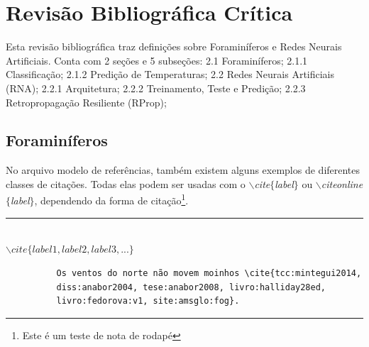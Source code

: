 \documentclass[oneside,openright,12pt]{ufsm_2015} %
\author{Marinara Rübenich Fumagalli}   %
\begin{document}
    \pretextual  %
    
    
    \geraintro  %
    
    \chapter{Revisão Bibliográfica Crítica}
    
        \par Esta revisão bibliográfica traz definições sobre Foraminíferos e Redes Neurais Artificiais. Conta com 2 seções e 5 subseções: 2.1 Foraminíferos; 2.1.1 Classificação; 2.1.2 Predição de Temperaturas; 2.2 Redes Neurais Artificiais (RNA); 2.2.1 Arquitetura; 2.2.2 Treinamento, Teste e Predição; 2.2.3 Retropropagação Resiliente (RProp); 
        
        \section{Foraminíferos}
            \par No arquivo modelo de referências, também existem alguns exemplos de diferentes classes de citações. Todas elas podem ser usadas com o \textit{$\backslash$cite$\{$label$\}$} ou \textit{$\backslash$citeonline$\{$label$\}$}, dependendo da forma de citação\footnote{Este é um teste de nota de rodapé}.
          
          \begin{center}\rule{0.5\textwidth}{1pt}\\$\backslash cite\{label1,label2,label3,...\}$\end{center}
        
          \begin{verbatim}
          Os ventos do norte não movem moinhos \cite{tcc:mintegui2014,
          diss:anabor2004, tese:anabor2008, livro:halliday28ed, 
          livro:fedorova:v1, site:amsglo:fog}.
          \end{verbatim}
            
\end{document}
